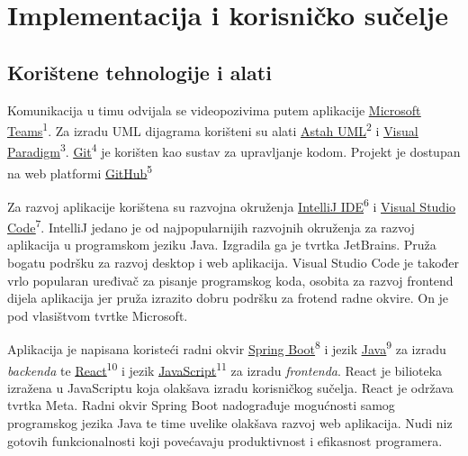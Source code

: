 \chapter{Implementacija i korisničko sučelje}
		
		
		\section{Korištene tehnologije i alati}
		
			Komunikacija u timu odvijala se videopozivima putem aplikacije \underline{\href{https://www.microsoft.com/en-us/microsoft-teams/group-chat-software}{Microsoft Teams}}\textsuperscript{1}. Za izradu UML dijagrama korišteni su alati \underline{\href{https://astah.net/products/astah-uml/}{Astah UML}}\textsuperscript{2} i \underline{\href{https://online.visual-paradigm.com/}{Visual Paradigm}}\textsuperscript{3}. \underline{\href{https://git-scm.com/}{Git}}\textsuperscript{4} je korišten kao sustav za upravljanje kodom. Projekt je dostupan na web platformi \underline{\href{https://github.com/}{GitHub}}\textsuperscript{5}
			
			\indent Za razvoj aplikacije korištena su razvojna okruženja \underline{\href{https://www.jetbrains.com/idea/}{IntelliJ IDE}}\textsuperscript{6} i \newline\underline{\href{https://code.visualstudio.com/}{Visual Studio Code}}\textsuperscript{7}. IntelliJ jedano je od najpopularnijih razvojnih okruženja za razvoj aplikacija u programskom jeziku Java. Izgradila ga je tvrtka JetBrains. Pruža bogatu podršku za razvoj desktop i web aplikacija. Visual Studio Code je također vrlo popularan uređivač za pisanje programskog koda, osobita za razvoj frontend dijela aplikacija jer pruža izrazito dobru podršku za frotend radne okvire. On je pod vlasištvom tvrtke Microsoft.
			
			\indent Aplikacija je napisana koristeći radni okvir \underline{\href{https://spring.io/projects/spring-boot/}{Spring Boot}}\textsuperscript{8} i jezik \underline{\href{https://www.oracle.com/java/}{Java}}\textsuperscript{9} za izradu \textit{backenda} te \underline{\href{https://react.dev/}{React}}\textsuperscript{10} i jezik \underline{\href{https://www.javascript.com/}{JavaScript}}\textsuperscript{11} za izradu \textit{frontenda}. React je bilioteka izražena u JavaScriptu koja olakšava izradu korisničkog sučelja. React je održava tvrtka Meta. Radni okvir Spring Boot nadograđuje mogućnosti samog programskog jezika Java te time uvelike olakšava razvoj web aplikacija. Nudi niz gotovih funkcionalnosti koji povećavaju produktivnost i efikasnost programera.
			
